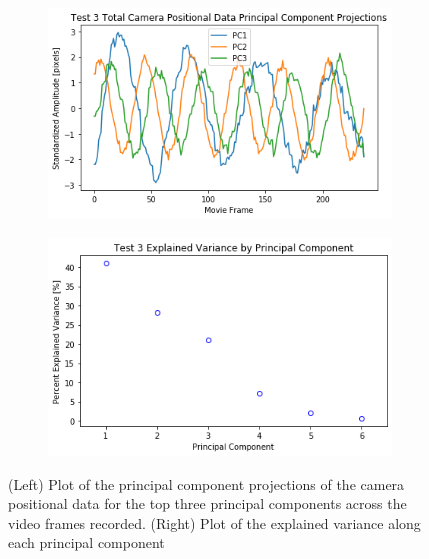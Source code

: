 \documentclass{article}
\begin{document}
\begin{figure}
\centering
   \begin{subfigure}{0.49\linewidth} \centering
     \includegraphics[scale=0.5]{T3_pcDynamics.png}
   \end{subfigure}
   \begin{subfigure}{0.49\linewidth} \centering
     \includegraphics[scale=0.5]{T3_pcExplainedVariance.png}
   \end{subfigure}
\caption{(Left) Plot of the principal component projections of the camera positional data for the top three principal components across the video frames recorded. (Right) Plot of the explained variance along each principal component} \label{fig:test3}
\end{figure}
\end{document}
